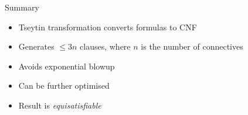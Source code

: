 \documentclass[xetex,aspectratio=169,14pt,hyperref={pdfpagelabels=true,pdflang={en-GB}}]{beamer}
\begin{document}
\begin{frame}
  {Summary}

  \begin{itemize}
  \item Tseytin transformation converts formulas to CNF
  \item Generates $\leq 3n$ clauses, where $n$ is the number of connectives
  \item Avoids exponential blowup
  \item Can be further optimised
  \item Result is \emph{equisatisfiable}
  \end{itemize}
\end{frame}



\end{document}
